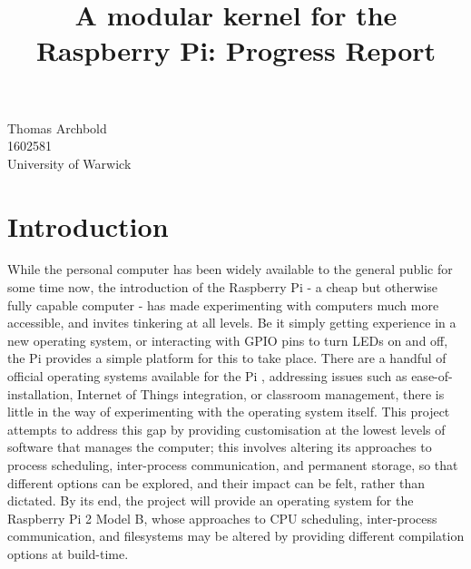 \documentclass[10pt,a4paper]{article}
\title{A modular kernel for the Raspberry Pi: Progress Report}
\begin{document}
\maketitle

\begin{center}
    Thomas Archbold \\
    1602581 \\
    University of Warwick \\
\end{center}

\section*{Introduction}
While the personal computer has been widely available to the general public for
some time now, the introduction of the Raspberry Pi - a cheap but otherwise
fully capable computer - has made experimenting with computers much more
accessible, and invites tinkering at all levels. Be it simply getting experience
in a new operating system, or interacting with GPIO pins to turn LEDs on and
off, the Pi provides a simple platform for this to take place. There are a
handful of official operating systems available for the Pi \cite{OSes},
addressing issues such as ease-of-installation, Internet of Things integration,
or classroom management, there is little in the way of experimenting with the
operating system itself. This project attempts to address this gap by providing
customisation at the lowest levels of software that manages the computer; this
involves altering its approaches to process scheduling, inter-process
communication, and permanent storage, so that different options can be explored,
and their impact can be felt, rather than dictated. By its end, the project will
provide an operating system for the Raspberry Pi 2 Model B, whose approaches to
CPU scheduling, inter-process communication, and filesystems may be altered by
providing different compilation options at build-time.
\end{document}
